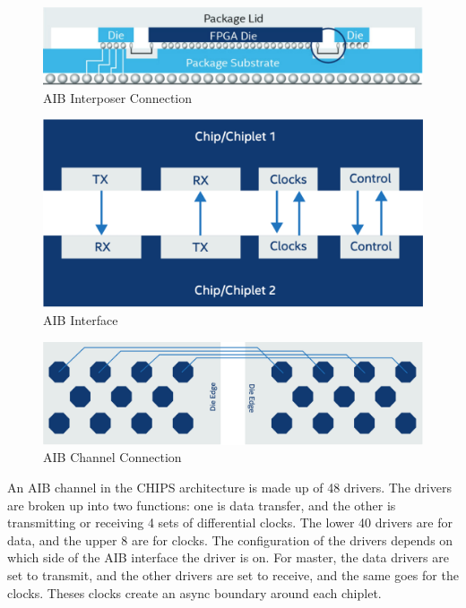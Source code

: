\documentclass[../main.tex]{subfiles}
\begin{document}
\begin{figure}
    \centering
    \includegraphics[scale=.25]{pngs/Interposer.png}
    \caption{AIB Interposer Connection\cite{AIBWhitePaper}}
    \label{fig:AIBInterposer}
\end{figure}
\begin{figure}
    \centering
    \includegraphics[scale=.4]{pngs/AIB-interface.png}
    \caption{AIB Interface\cite{AIBWhitePaper}}
    \label{fig:AIBInterface}
\end{figure}

\begin{figure}
    \centering
    \includegraphics[scale=.2]{pngs/AIB-Channel.png}
    \caption{AIB Channel Connection\cite{AIBWhitePaper}}
    \label{fig:AIBChannel}
\end{figure}

An AIB channel in the CHIPS architecture is made up of 48 drivers. The drivers are broken up into two functions: one is data transfer, and the other is transmitting or receiving 4 sets of differential clocks. The lower 40 drivers are for data, and the upper 8 are for clocks. The configuration of the drivers depends on which side of the AIB interface the driver is on. For master, the data drivers are set to transmit, and the other drivers are set to receive, and the same goes for the clocks. Theses clocks create an async boundary around each chiplet. 
\end{document}
